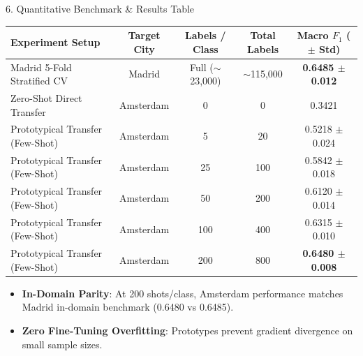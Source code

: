 \documentclass[aspectratio=169,10pt]{beamer}
\begin{document}
\begin{frame}{6. Quantitative Benchmark \& Results Table}
  \centering
  \small
  \begin{tabular}{lcccc}
    \hline
    \textbf{Experiment Setup} & \textbf{Target City} & \textbf{Labels / Class} & \textbf{Total Labels} & \textbf{Macro $F_1$ ($\pm$ Std)} \\
    \hline
    Madrid 5-Fold Stratified CV & Madrid & Full ($\sim$23,000) & $\sim$115,000 & \textbf{0.6485 $\pm$ 0.012} \\
    Zero-Shot Direct Transfer & Amsterdam & 0 & 0 & 0.3421 \\
    \hline
    Prototypical Transfer (Few-Shot) & Amsterdam & 5 & 20 & 0.5218 $\pm$ 0.024 \\
    Prototypical Transfer (Few-Shot) & Amsterdam & 25 & 100 & 0.5842 $\pm$ 0.018 \\
    Prototypical Transfer (Few-Shot) & Amsterdam & 50 & 200 & 0.6120 $\pm$ 0.014 \\
    Prototypical Transfer (Few-Shot) & Amsterdam & 100 & 400 & 0.6315 $\pm$ 0.010 \\
    Prototypical Transfer (Few-Shot) & Amsterdam & 200 & 800 & \textbf{0.6480 $\pm$ 0.008} \\
    \hline
  \end{tabular}

  \vspace{0.4cm}
  \begin{itemize}
    \item \textbf{In-Domain Parity}: At 200 shots/class, Amsterdam performance matches Madrid in-domain benchmark (0.6480 vs 0.6485).
    \item \textbf{Zero Fine-Tuning Overfitting}: Prototypes prevent gradient divergence on small sample sizes.
  \end{itemize}
\end{frame}
\end{document}
